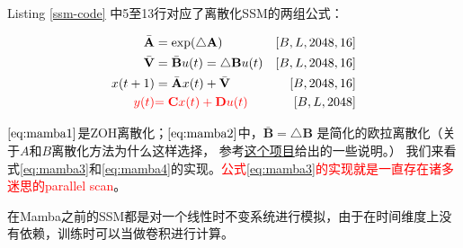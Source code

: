 




Listing \ref{ssm-code} 中5至13行对应了离散化SSM的两组公式：

\begin{align}
\bar{\mathbf{A}} &= \exp(\triangle \mathbf{A}) & [B, L, 2048, 16] \label{eq:mamba1}\\
\bar{\mathbf{V}} &= \bar{\mathbf{B}}u(t) = \triangle \mathbf{B} u(t) & [B, L, 2048,16]\label{eq:mamba2}\\
x(t+1)&=\bar{\mathbf{A}}x(t) + \bar{\mathbf{V}} & [B, 2048, 16]\label{eq:mamba3}\\
\textcolor{red}{y(t)} &\textcolor{red}{=\mathbf{C}x(t) + \mathbf{D}u(t)} & [B, L, 2048]\label{eq:mamba4}
\end{align}

$\eqref{eq:mamba1}$是ZOH离散化；$\eqref{eq:mamba2}$中，$\bar{\mathbf{B}} = \triangle \mathbf{B}$ 是简化的欧拉离散化（关于$A$和$B$离散化方法为什么这样选择，
参考\href{https://github.com/johnma2006/mamba-minimal/blob/master/model.py#L305}{这个项目}给出的一些说明。）
我们来看式\eqref{eq:mamba3}和\eqref{eq:mamba4}的实现。\textcolor{red}{公式\eqref{eq:mamba3}的实现就是一直存在诸多迷思的parallel scan}。

在Mamba之前的SSM都是对一个线性时不变系统进行模拟，由于在时间维度上没有依赖，训练时可以当做卷积进行计算。

